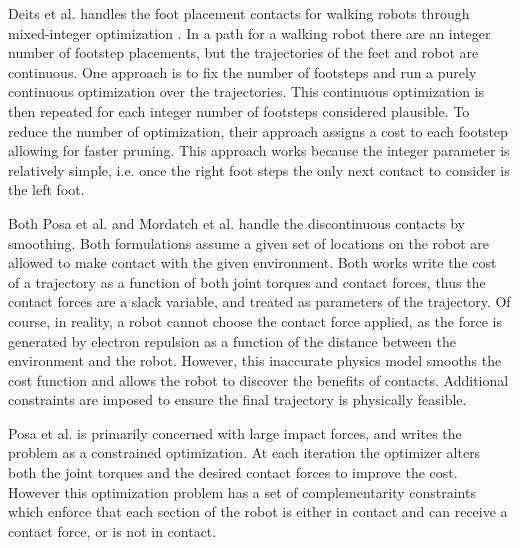 \documentclass[../thesis.tex]{subfiles}
\begin{document}
Deits et al. handles the foot placement contacts for walking robots through mixed-integer optimization \cite{Deits2015}.
In a path for a walking robot there are an integer number of footstep placements, but the trajectories of the feet and robot are continuous.
One approach is to fix the number of footsteps and run a purely continuous optimization over the trajectories.
This continuous optimization is then repeated for each integer number of footsteps considered plausible.
To reduce the number of optimization, their approach assigns a cost to each footstep allowing for faster pruning.
This approach works because the integer parameter is relatively simple, i.e. once the right foot steps the only next contact to consider is the left foot.


Both Posa et al. \cite{Posa2013} and Mordatch et al. \cite{Mordatch2012}  handle the discontinuous contacts by smoothing.
Both formulations assume a given set of locations on the robot are allowed to make contact with the given environment.
Both works write the cost of a trajectory as a function of both joint torques and contact forces, thus the contact forces are a slack variable, and treated as parameters of the trajectory.
Of course, in reality, a robot cannot choose the contact force applied, as the force is generated by electron repulsion as a function of the distance between the environment and the robot.
However, this inaccurate physics model smooths the cost function and allows the robot to discover the benefits of contacts.
Additional constraints are imposed to ensure the final trajectory is physically feasible.


Posa et al. \cite{Posa2013} is primarily concerned with large impact forces, and writes the problem as a constrained optimization.
At each iteration the optimizer alters both the joint torques and the desired contact forces to improve the cost.
However this optimization problem has a set of complementarity constraints which enforce that each section of the robot is either in contact and can receive a contact force, or is not in contact.
\end{document}
